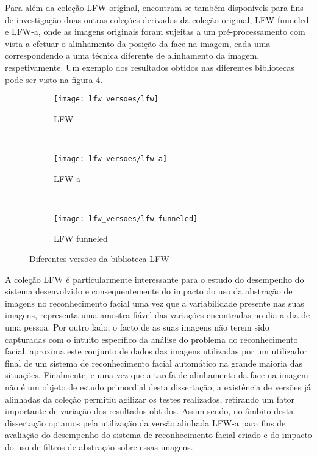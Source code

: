 Para além da coleção LFW original, encontram-se também disponíveis para fins de investigação duas outras coleções derivadas da coleção original, LFW funneled e LFW-a, onde as imagens originais foram sujeitas a um pré-processamento com vista a efetuar o alinhamento da posição da face na imagem, cada uma correspondendo a uma técnica diferente de alinhamento da imagem, respetivamente. Um exemplo dos resultados obtidos nas diferentes bibliotecas pode ser visto na figura \ref{fig:lfwversoes}.

\begin{figure}[h]
        \centering
        \begin{subfigure}[b]{0.25\textwidth}
                \centering
                \texttt{[image: lfw\_versoes/lfw]}
                \caption{LFW}
                \label{fig:lfw_original}
        \end{subfigure}%
        ~ 
        \begin{subfigure}[b]{0.25\textwidth}
                \centering
                \texttt{[image: lfw\_versoes/lfw-a]}
                \caption{LFW-a}
                \label{fig:lfw_a}
        \end{subfigure}
        ~ 
        \begin{subfigure}[b]{0.25\textwidth}
                \centering
                \texttt{[image: lfw\_versoes/lfw-funneled]}
                \caption{LFW funneled}
                \label{fig:lfw_funneled}
        \end{subfigure}
        \caption{Diferentes versões da biblioteca LFW}\label{fig:lfwversoes}
\end{figure}

A coleção LFW é particularmente interessante para o estudo do desempenho do sistema desenvolvido e consequentemente do impacto do uso da abstração de imagens no reconhecimento facial uma vez que a variabilidade presente nas suas imagens, representa uma amostra fiável das variações encontradas no dia-a-dia de uma pessoa. Por outro lado, o facto de as suas imagens não terem sido capturadas com o intuito específico da análise do problema do reconhecimento facial, aproxima este conjunto de dados das imagens utilizadas por um utilizador final de um sistema de reconhecimento facial automático na grande maioria das situações. Finalmente, e uma vez que a tarefa de alinhamento da face na imagem não é um objeto de estudo primordial desta dissertação, a existência de versões já alinhadas da coleção permitiu agilizar os testes realizados, retirando um fator importante de variação dos resultados obtidos. Assim sendo, no âmbito desta dissertação optamos pela utilização da versão alinhada LFW-a \citep{autor} para fins de avaliação do desempenho do sistema de reconhecimento facial criado e do impacto do uso de filtros de abstração sobre essas imagens.

